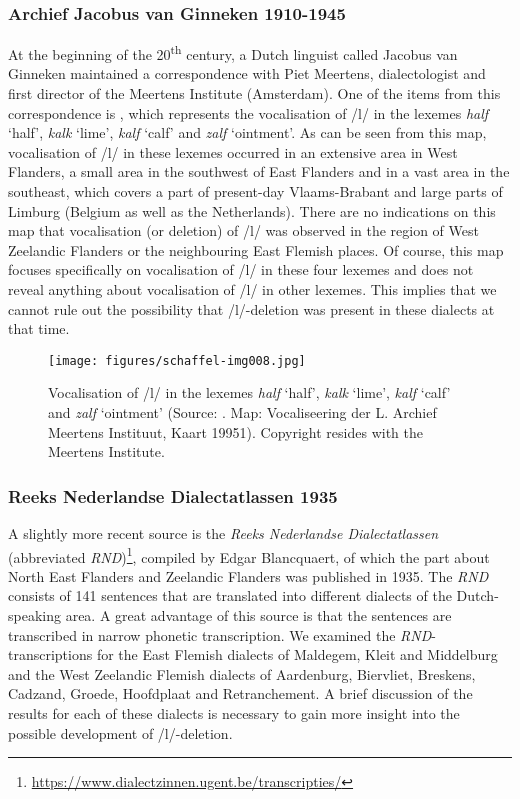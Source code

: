 \documentclass[output=paper,hidelinks,draftmode]{langscibook}
\begin{document}
\subsubsection{Archief Jacobus van Ginneken 1910-1945} 

At the beginning of the 20\textsuperscript{th} century, a Dutch linguist called Jacobus van Ginneken maintained a correspondence with Piet Meertens, dialectologist and first director of the Meertens Institute (Amsterdam). One of the items from this correspondence is , which represents the vocalisation of /l/ in the lexemes \textit{half} ‘half’, \textit{kalk} ‘lime’, \textit{kalf} ‘calf’ and \textit{zalf} ‘ointment’. As can be seen from this map, vocalisation of /l/ in these lexemes occurred in an extensive area in West Flanders, a small area in the southwest of East Flanders and in a vast area in the southeast, which covers a part of present-day Vlaams-Brabant and large parts of Limburg (Belgium as well as the Netherlands). There are no indications on this map that vocalisation (or deletion) of /l/ was observed in the region of West Zeelandic Flanders or the neighbouring East Flemish places. Of course, this map focuses specifically on vocalisation of /l/ in these four lexemes and does not reveal anything about vocalisation of /l/ in other lexemes. This implies that we cannot rule out the possibility that /l/-deletion was present in these dialects at that time.


\begin{figure}[t]
\caption{Vocalisation of /l/ in the lexemes \textit{half} ‘half’, \textit{kalk} ‘lime’, \textit{kalf} ‘calf’ and \textit{zalf} ‘ointment’ (Source: \citeauthor{Ginneken01}. Map: Vocaliseering der L. Archief Meertens Instituut, Kaart 19951). Copyright resides with the Meertens Institute.}
\label{fig:schaffel:7}
\texttt{[image: figures/schaffel-img008.jpg]}
\end{figure}


\subsubsection{Reeks Nederlandse Dialectatlassen 1935} 
A slightly more recent source is the \textit{Reeks Nederlandse Dialectatlassen} (abbreviated \textit{RND})\footnote{ \url{https://www.dialectzinnen.ugent.be/transcripties/}}, compiled by Edgar Blancquaert, of which the part about North East Flanders and Zeelandic Flanders was published in 1935. The \textit{RND} consists of 141 sentences that are translated into different dialects of the Dutch-speaking area. A great advantage of this source is that the sentences are transcribed in narrow phonetic transcription. We examined the \textit{RND}{}-transcriptions for the East Flemish dialects of Maldegem, Kleit and Middelburg and the West Zeelandic Flemish dialects of Aardenburg, Biervliet, Breskens, Cadzand, Groede, Hoofdplaat and Retranchement. A brief discussion of the results for each of these dialects is necessary to gain more insight into the possible development of /l/-deletion.
\end{document}
